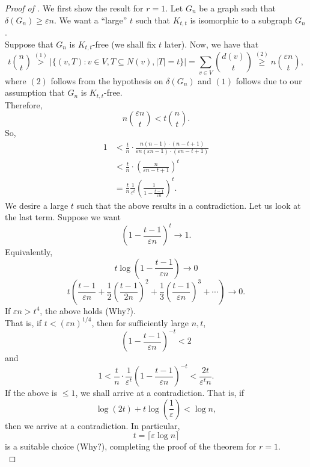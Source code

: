 \documentclass{article}
\begin{document}
			\begin{proof}[Proof of ]
				We first show the result for $r=1$. Let $G_n$ be a graph such that $\delta(G_n) \ge \varepsilon n$. We want a ``large'' $t$ such that $K_{t,t}$ is isomorphic to a subgraph $G_n$.\\
				Suppose that $G_n$ is $K_{t,t}$-free (we shall fix $t$ later).
				Now, we have that
				\[ t \binom{n}{t} \stackrel{(1)}{>} |\{(v,T) : v\in V, T \subseteq N(v), |T|=t\}| = \sum_{v\in V} \binom{d(v)}{t} \stackrel{(2)}{\ge} n \binom{\varepsilon n}{t}, \]
				where $(2)$ follows from the hypothesis on $\delta(G_n)$ and $(1)$ follows due to our assumption that $G_n$ is $K_{t,t}$-free.\\
				Therefore,
				\[ n\binom{\varepsilon n}{t} < t \binom{n}{t}. \]
				So,
				\begin{align*}
					1 &< \frac{t}{n} \cdot \frac{n(n-1)\cdot (n-t+1)}{\varepsilon n(\varepsilon n-1)\cdot (\varepsilon n-t+1)} \\
					&< \frac{t}{n} \cdot \left(\frac{n}{\varepsilon n-t+1}\right)^t \\
					&= \frac{t}{n} \frac{1}{\varepsilon^t} \left(\frac{1}{1 - \frac{t-1}{\varepsilon n}}\right)^t.
				\end{align*}
				We desire a large $t$ such that the above results in a contradiction.
				Let us look at the last term. Suppose we want
				\[ \left(1 - \frac{t-1}{\varepsilon n}\right)^t \to 1. \]
				Equivalently,
				\[ t \log\left(1 - \frac{t-1}{\varepsilon n}\right) \to 0 \]
				\[ t \left(\frac{t-1}{\varepsilon n} + \frac{1}{2}\left(\frac{t-1}{2n}\right)^2 + \frac{1}{3} \left(\frac{t-1}{\varepsilon n}\right)^3 + \cdots\right) \to 0. \]
				If $\varepsilon n > t^4$, the above holds (Why?).\\
				That is, if $t < (\varepsilon n)^{1/4}$, then for sufficiently large $n, t$,
				\[ \left(1 - \frac{t-1}{\varepsilon n}\right)^{-t} < 2 \]
				and
				\[ 1 < \frac{t}{n} \cdot \frac{1}{\varepsilon^t} \left(1 - \frac{t-1}{\varepsilon n}\right)^{-t} < \frac{2t}{\varepsilon^t n}. \]
				If the above is $\le 1$, we shall arrive at a contradiction. That is, if
				\[ \log(2t) + t \log\left(\frac{1}{\varepsilon}\right) < \log n, \]
				then we arrive at a contradiction. In particular,
				\[ t = \lceil \varepsilon \log n \rceil \]
				is a suitable choice (Why?), completing the proof of the theorem for $r=1$.\\


\end{proof}
\end{document}
